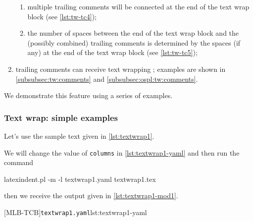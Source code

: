 \begin{enumerate}
\begin{enumerate}
         \item multiple trailing comments will be connected at the end of the text wrap
               block (see \cref{lst:tw-tc4});
         \item the number of spaces between the end of the text wrap block and the
               (possibly combined) trailing comments is determined by the spaces (if any)
               at the end of the text wrap block (see \cref{lst:tw-tc5});
        \end{enumerate}
  \item trailing comments can receive text wrapping ; examples are shown in \cref{subsubsec:tw:comments} and
        \cref{subsubsec:ospl:tw:comments}.
 \end{enumerate}

 We demonstrate this feature using a series of examples.

\subsubsection{Text wrap: simple examples}\label{subsec:textwrapping-quick-start}

 \begin{example}
 Let's use the sample text given in \cref{lst:textwrap1}. 


 We will change the value of \texttt{columns} in \cref{lst:textwrap1-yaml} and then run
 the command

 \begin{commandshell}
latexindent.pl -m -l textwrap1.yaml textwrap1.tex
\end{commandshell}

 then we receive the output given in \cref{lst:textwrap1-mod1}.

 \begin{cmhtcbraster}[raster column skip=.1\linewidth]
  [MLB-TCB]{\texttt{textwrap1.yaml}}{lst:textwrap1-yaml}
 \end{cmhtcbraster}
 \end{example}

